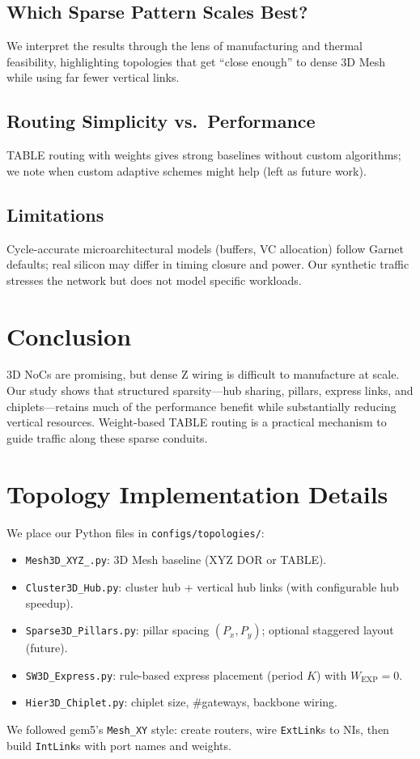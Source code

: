 \documentclass[11pt]{article}
\begin{document}
\subsection{Which Sparse Pattern Scales Best?}
We interpret the results through the lens of manufacturing and thermal feasibility, highlighting topologies that get “close enough” to dense 3D Mesh while using far fewer vertical links.

\subsection{Routing Simplicity vs.\ Performance}
TABLE routing with weights gives strong baselines without custom algorithms; we note when custom adaptive schemes might help (left as future work).

\subsection{Limitations}
Cycle-accurate microarchitectural models (buffers, VC allocation) follow Garnet defaults; real silicon may differ in timing closure and power. Our synthetic traffic stresses the network but does not model specific workloads.

\section{Conclusion}
3D NoCs are promising, but dense Z wiring is difficult to manufacture at scale. Our study shows that structured sparsity—hub sharing, pillars, express links, and chiplets—retains much of the performance benefit while substantially reducing vertical resources. Weight-based TABLE routing is a practical mechanism to guide traffic along these sparse conduits.

\appendix

\section{Topology Implementation Details}
We place our Python files in \texttt{configs/topologies/}: 
\begin{itemize}[leftmargin=1em]
  \item \texttt{Mesh3D\_XYZ\_.py}: 3D Mesh baseline (XYZ DOR or TABLE).
  \item \texttt{Cluster3D\_Hub.py}: cluster hub + vertical hub links (with configurable hub speedup).
  \item \texttt{Sparse3D\_Pillars.py}: pillar spacing $(P_x,P_y)$; optional staggered layout (future).
  \item \texttt{SW3D\_Express.py}: rule-based express placement (period $K$) with $W_{\text{EXP}}{=}0$.
  \item \texttt{Hier3D\_Chiplet.py}: chiplet size, \#gateways, backbone wiring.
\end{itemize}
We followed gem5’s \texttt{Mesh\_XY} style: create routers, wire \texttt{ExtLink}s to NIs, then build \texttt{IntLink}s with port names and weights.
\end{document}
